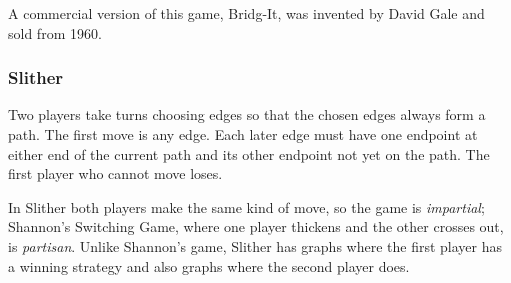 \begin{note}[Bridg-It]
A commercial version of this game, Bridg-It, was invented by David Gale and sold from 1960.
\end{note}

\subsubsection{Slither}
\label{sec:12-6-2}

\begin{definition}[Slither]
Two players take turns choosing edges so that the chosen edges always form a path. The first move is any edge. Each later edge must have one endpoint at either end of the current path and its other endpoint not yet on the path. The first player who cannot move loses.
\end{definition}

\begin{note}
In Slither both players make the same kind of move, so the game is \emph{impartial}; Shannon's Switching Game, where one player thickens and the other crosses out, is \emph{partisan}. Unlike Shannon's game, Slither has graphs where the first player has a winning strategy and also graphs where the second player does.
\end{note}

